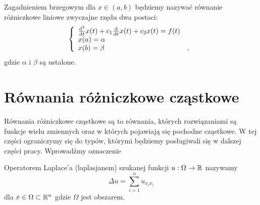 \documentclass[12pt,a4paper]{report}
\begin{document}
\begin{problem}
Zagadnieniem brzegowym dla $ x \in (a,b) $ będziemy nazywać równanie różniczkowe liniowe zwyczajne rzędu dwa postaci:
\begin{equation}
\left\{\begin{array}{ll}
\ddx [^2]{t} x(t) + c_1\ddx{t} x(t) + c_2x(t) = f(t) & \\
x(a) = \alpha & \\
x(b) = \beta &,
\end{array} \right.
\end{equation}
gdzie $\alpha$ i $\beta$ są ustalone. 
\end{problem}
\section{Równania różniczkowe cząstkowe}
Równania różniczkowe cząstkowe są to równania, których rozwiązaniami są funkcje wielu zmiennych oraz w których pojawiają się pochodne cząstkowe. W tej części ograniczymy się do typów, którymi będziemy  posługiwali się  w dalszej części pracy. Wprowadźmy oznaczenie 
\begin{definition}
Operatorem Laplace'a (laplasjanem) szukanej funkcji $u: \Omega \to \setR$ nazywamy 
$$
\Delta u  = \sum_{i=1}^{n} u_{x_{i} x_{i}}  
$$
dla $ x \in \Omega \subset \setR^{n} $ gdzie $\Omega$ jest obszarem. 
\end{definition}
\end{document}

